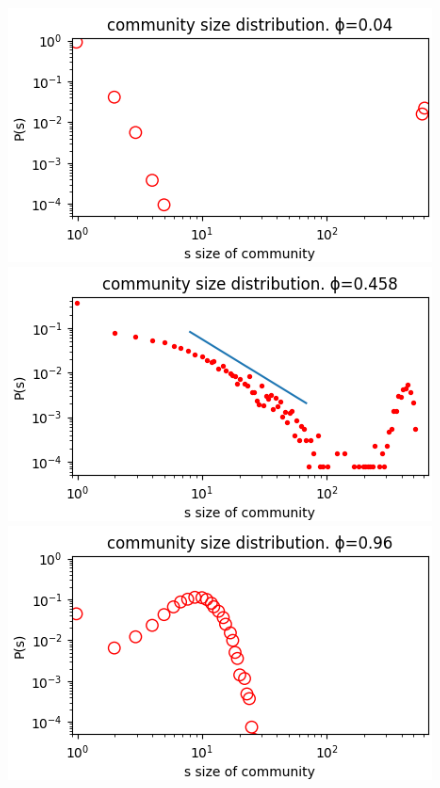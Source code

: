 \documentclass[11pt]{article}
\begin{document}
\begin{figure}[!htb]
  \includegraphics[width=\linewidth]{images/holme/size_distribution0.04s.png}
  \includegraphics[width=\linewidth]{images/holme/size_distribution0.458s.png}
  \includegraphics[width=\linewidth]{images/holme/size_distribution0.96s.png}
  

\end{figure}
\end{document}
